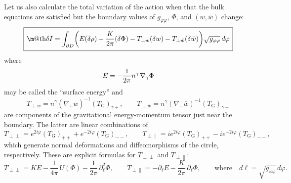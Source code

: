 \documentclass[12pt]{article}
\makeatletter
\newcommand*{\wideboxed}[1]{\setlength{\fboxsep}{1ex}%
  \fbox{\m@th$\displaystyle#1$}}
\newcommand{\ph}{\varphi}
\newcommand{\Grav}{\mathrm{G}}
\makeatother
\begin{document}
Let us also calculate the total variation of the action when that the bulk equations are satisfied but the boundary values of $g_{\ph\ph}$, $\Phi$, and $(w,\bar{w})$ change:
\begin{equation}\label{totvarI}
\wideboxed{
\delta I=\int_{\partial D}
\biggl(E(\delta\rho)-\frac{K}{2\pi}(\delta\Phi)
-T_{\perp w}(\delta w)-T_{\perp\bar{w}}(\delta\bar{w})\biggr)
\sqrt{g_{\ph\ph}}\,d\ph
}
\end{equation}
where
\begin{equation}
E=-\frac{1}{2\pi}n^{\gamma}\kern1pt\nabla_{\gamma}\Phi
\end{equation}
may be called the ``surface energy'' and
\begin{equation}
T_{\perp w}=n^{\gamma}(\nabla_{+}w)^{-1}(T_{\Grav})_{\gamma+},\qquad
T_{\perp\bar{w}}=n^{\gamma}(\nabla_{-}\bar{w})^{-1}(T_{\Grav})_{\gamma-}
\end{equation}
are components of the gravitational energy-momentum tensor just near the boundary. The latter are linear combinations of
\begin{equation}
T_{\perp\perp}=e^{2i\ph}(T_{\Grav})_{++}+e^{-2i\ph}(T_{\Grav})_{--},\qquad
T_{\perp\parallel}=ie^{2i\ph}(T_{\Grav})_{++}-ie^{-2i\ph}(T_{\Grav})_{--},
\end{equation}
which generate normal deformations and diffeomorphisms of the circle, respectively. These are explicit formulas for $T_{\perp\perp}$ and $T_{\perp\parallel}$:
\begin{equation}\label{Tpp_explicit}
T_{\perp\perp}
=KE-\frac{1}{4\pi}\,U(\Phi)-\frac{1}{2\pi}\,\partial_{\ell}^2\Phi,\qquad
T_{\perp\parallel}
=-\partial_{\ell}E-\frac{K}{2\pi}\,\partial_{\ell}\Phi,\qquad
\text{where}\quad d\ell=\sqrt{g_{\ph\ph}}\,d\ph.
\end{equation}
\end{document}
